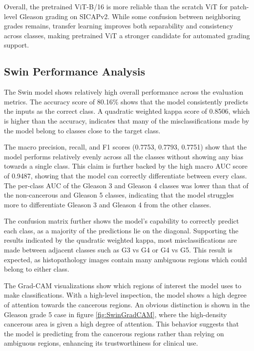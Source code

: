 \documentclass[conference]{IEEEtran}
\begin{document}
Overall, the pretrained ViT-B/16 is more reliable than the scratch ViT for patch-level Gleason grading on SICAPv2. While some confusion between neighboring grades remains, transfer learning improves both separability and consistency across classes, making pretrained ViT a stronger candidate for automated grading support.

\subsection{\textbf{Swin Performance Analysis}}
The Swin model shows relatively high overall performance across the evaluation metrics. The accuracy score of 80.16\% shows that the model consistently predicts the inputs as the correct class. A quadratic weighted kappa score of 0.8506, which is higher than the accuracy, indicates that many of the misclassifications made by the model belong to classes close to the target class.

The macro precision, recall, and F1 scores (0.7753, 0.7793, 0.7751) show that the model performs relatively evenly across all the classes without showing any bias towards a single class. This claim is further backed by the high macro AUC score of 0.9487, showing that the model can correctly differentiate between every class. The per-class AUC of the Gleason 3 and Gleason 4 classes was lower than that of the non-cancerous and Gleason 5 classes, indicating that the model struggles more to differentiate Gleason 3 and Gleason 4 from the other classes.

The confusion matrix further shows the model's capability to correctly predict each class, as a majority of the predictions lie on the diagonal. Supporting the results indicated by the quadratic weighted kappa, most misclassifications are made between adjacent classes such as G3 vs G4 or G4 vs G5. This result is expected, as histopathology images contain many ambiguous regions which could belong to either class.

The Grad-CAM visualizations show which regions of interest the model uses to make classifications. With a high-level inspection, the model shows a high degree of attention towards the cancerous regions. An obvious distinction is shown in the Gleason grade 5 case in figure \ref{fig:SwinGradCAM}, where the high-density cancerous area is given a high degree of attention. This behavior suggests that the model is predicting from the cancerous regions rather than relying on ambiguous regions, enhancing its trustworthiness for clinical use.
\end{document}
